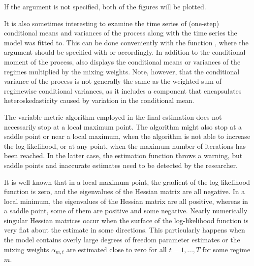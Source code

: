 \documentclass[nojss]{jss} %
\begin{document}
If the argument  is not specified, both of the figures will be plotted.

It is also sometimes interesting to examine the time series of (one-step) conditional means and variances of the process along with the time series the model was fitted to. This can be done conveniently with the function , where the argument  should be specified with  or  accordingly. In addition to the conditional moment of the process,  also displays the conditional means or variances of the regimes multiplied by the mixing weights. Note, however, that the conditional variance of the process is not generally the same as the weighted sum of regimewise conditional variances, as it includes a component that encapsulates heteroskedasticity caused by variation in the conditional mean.


The variable metric algorithm employed in the final estimation does not necessarily stop at a local maximum point. The algorithm might also stop at a saddle point or near a local maximum, when the algorithm is not able to increase the log-likelihood, or at any point, when the maximum number of iterations has been reached. In the latter case, the estimation function throws a warning, but saddle points and inaccurate estimates need to be detected by the researcher.

It is well known that in a local maximum point, the gradient of the log-likelihood function is zero, and the eigenvalues of the Hessian matrix are all negative. In a local minimum, the eigenvalues of the Hessian matrix are all positive, whereas in a saddle point, some of them are positive and some negative. Nearly numerically singular Hessian matrices occur when the surface of the log-likelihood function is very flat about the estimate in some directions. This particularly happens when the model contains overly large degrees of freedom parameter estimates or the mixing weights $\alpha_{m,t}$ are estimated close to zero for all $t=1,...,T$ for some regime $m$.
\end{document}
